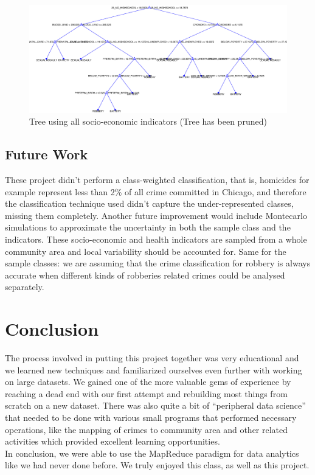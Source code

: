 \documentclass[a4paper,10pt]{article}
\begin{document}
\begin{figure}[H]
	\centering
	\includegraphics[width=0.6\linewidth]{media/full_tree.eps}
	\caption{Tree using all socio-economic indicators (Tree has been pruned)}
\end{figure}

\subsection{Future Work}

These project didn't perform a class-weighted classification, that is, homicides for example represent less than 2\% of all crime committed in Chicago, and therefore the classification technique used didn't capture the under-represented classes, missing them completely.
Another future improvement would include Montecarlo simulations to approximate the uncertainty in both the sample class and the indicators. These socio-economic and health indicators are sampled from a whole community area and local variability should be accounted for. Same for the sample classes: we are assuming that the crime classification for robbery is always accurate when different kinds of robberies related crimes could be analysed separately.


\section{Conclusion}

The process involved in putting this project together was very educational and we learned new techniques and familiarized ourselves even further with working on large datasets. We gained one of the more valuable gems of experience by reaching a dead end with our first attempt and rebuilding most things from scratch on a new dataset. There was also quite a bit of “peripheral data science” that needed to be done with various small programs that performed necessary operations, like the mapping of crimes to community area and other related activities which provided excellent learning opportunities.\\

In conclusion, we were able to use the MapReduce paradigm for data analytics like we had never done before. We truly enjoyed this class, as well as this project.

\newpage



\end{document}
